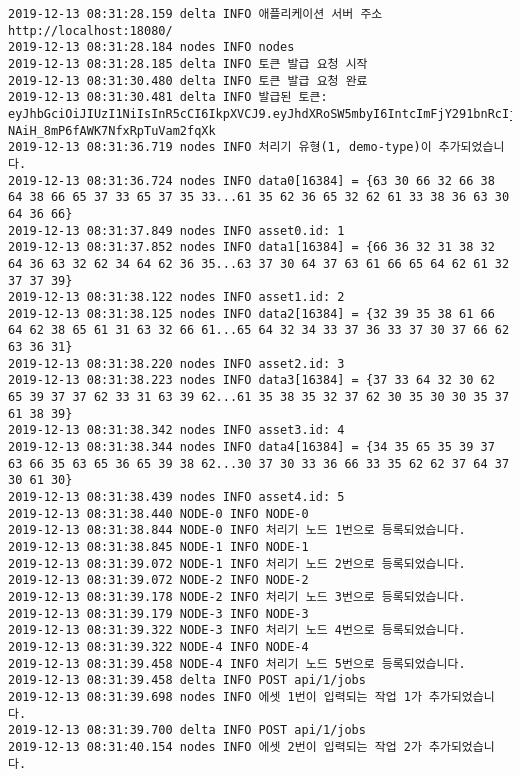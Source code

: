 \begin{Verbatim}[fontsize=\tiny, breaklines=true, breakanywhere=true]
2019-12-13 08:31:28.159 delta INFO 애플리케이션 서버 주소 http://localhost:18080/
2019-12-13 08:31:28.184 nodes INFO nodes
2019-12-13 08:31:28.185 delta INFO 토큰 발급 요청 시작
2019-12-13 08:31:30.480 delta INFO 토큰 발급 요청 완료
2019-12-13 08:31:30.481 delta INFO 발급된 토큰: eyJhbGciOiJIUzI1NiIsInR5cCI6IkpXVCJ9.eyJhdXRoSW5mbyI6IntcImFjY291bnRcIjp7XCJpZFwiOjEsXCJ1c2VybmFtZVwiOlwiRGVmYXVsdEFkbWluVXNlclwifSxcInJvbGVcIjpcIkFkbWluXCJ9IiwianRpIjoiMGI1NjA5OGQ4MGU5MzU4YzdlYzRkMWVlZWI5NzBmMzFmNDRlYzU2ZGIwNDAxNjY3MWZhMDQxN2I3ZGY3NzhlNyIsImlzcyI6IkRlbHRhLkFwcFNlcnZlciIsImF1ZCI6IkRlbHRhLkFwcFNlcnZlciJ9.yklmlEXHH5kT0-NAiH_8mP6fAWK7NfxRpTuVam2fqXk
2019-12-13 08:31:36.719 nodes INFO 처리기 유형(1, demo-type)이 추가되었습니다.
2019-12-13 08:31:36.724 nodes INFO data0[16384] = {63 30 66 32 66 38 64 38 66 65 37 33 65 37 35 33...61 35 62 36 65 32 62 61 33 38 36 63 30 64 36 66}
2019-12-13 08:31:37.849 nodes INFO asset0.id: 1
2019-12-13 08:31:37.852 nodes INFO data1[16384] = {66 36 32 31 38 32 64 36 63 32 62 34 64 62 36 35...63 37 30 64 37 63 61 66 65 64 62 61 32 37 37 39}
2019-12-13 08:31:38.122 nodes INFO asset1.id: 2
2019-12-13 08:31:38.125 nodes INFO data2[16384] = {32 39 35 38 61 66 64 62 38 65 61 31 63 32 66 61...65 64 32 34 33 37 36 33 37 30 37 66 62 63 36 31}
2019-12-13 08:31:38.220 nodes INFO asset2.id: 3
2019-12-13 08:31:38.223 nodes INFO data3[16384] = {37 33 64 32 30 62 65 39 37 37 62 33 31 63 39 62...61 35 38 35 32 37 62 30 35 30 30 35 37 61 38 39}
2019-12-13 08:31:38.342 nodes INFO asset3.id: 4
2019-12-13 08:31:38.344 nodes INFO data4[16384] = {34 35 65 35 39 37 63 66 35 63 65 36 65 39 38 62...30 37 30 33 36 66 33 35 62 62 37 64 37 30 61 30}
2019-12-13 08:31:38.439 nodes INFO asset4.id: 5
2019-12-13 08:31:38.440 NODE-0 INFO NODE-0
2019-12-13 08:31:38.844 NODE-0 INFO 처리기 노드 1번으로 등록되었습니다.
2019-12-13 08:31:38.845 NODE-1 INFO NODE-1
2019-12-13 08:31:39.072 NODE-1 INFO 처리기 노드 2번으로 등록되었습니다.
2019-12-13 08:31:39.072 NODE-2 INFO NODE-2
2019-12-13 08:31:39.178 NODE-2 INFO 처리기 노드 3번으로 등록되었습니다.
2019-12-13 08:31:39.179 NODE-3 INFO NODE-3
2019-12-13 08:31:39.322 NODE-3 INFO 처리기 노드 4번으로 등록되었습니다.
2019-12-13 08:31:39.322 NODE-4 INFO NODE-4
2019-12-13 08:31:39.458 NODE-4 INFO 처리기 노드 5번으로 등록되었습니다.
2019-12-13 08:31:39.458 delta INFO POST api/1/jobs
2019-12-13 08:31:39.698 nodes INFO 에셋 1번이 입력되는 작업 1가 추가되었습니다.
2019-12-13 08:31:39.700 delta INFO POST api/1/jobs
2019-12-13 08:31:40.154 nodes INFO 에셋 2번이 입력되는 작업 2가 추가되었습니다.

\end{Verbatim}
